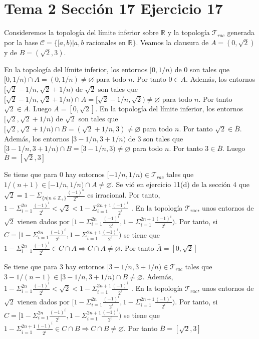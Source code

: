 \documentclass{article}
\begin{document}
\section{Tema 2 Sección 17 Ejercicio 17}
Consideremos la topología del límite inferior sobre $\mathbb{R}$ y la topología $\mathcal{T}_{rac}$ generada por la base $\mathcal{C}=\{[a,b)| a,b \text{ racionales en } \mathbb{R}\}$. Veamos la clausura de $A=(0,\sqrt{2})$ y de $B=(\sqrt{2},3)$. 

En la topología del límite inferior, los entornos $[0,1/n)$ de $0$ son tales que $[0,1/n)\cap A=(0,1/n)\neq \varnothing$ para todo $n$. Por tanto $0\in \overline{A}$. Además, los entornos $[\sqrt{2}-1/n,\sqrt{2}+1/n)$ de $\sqrt{2}$ son tales que $[\sqrt{2}-1/n,\sqrt{2}+1/n)\cap A=[\sqrt{2}-1/n,\sqrt{2})\neq \varnothing$ para todo $n$. Por tanto $\sqrt{2}\in \overline{A}$. Luego $\overline{A}= [0,\sqrt{2}]$. En la topología del límite inferior, los entornos $[\sqrt{2},\sqrt{2}+1/n)$ de $\sqrt{2}$ son tales que $[\sqrt{2},\sqrt{2}+1/n)\cap B=(\sqrt{2}+1/n,3)\neq \varnothing$ para todo $n$. Por tanto $\sqrt{2}\in \overline{B}$. Además, los entornos $[3-1/n,3+1/n)$ de $3$ son tales que $[3-1/n,3+1/n)\cap B=[3-1/n,3)\neq \varnothing$ para todo $n$. Por tanto $3\in \overline{B}$. Luego $\overline{B}= [\sqrt{2},3]$

Se tiene que para $0$ hay entornos $[-1/n,1/n)\in \mathcal{T}_{rac}$ tales que $1/(n+1)\in [-1/n,1/n)\cap A\neq \varnothing$.
Se vió en ejercicio 11(d) de la sección 4 que $\sqrt{2}=1-\Sigma_{\{n|n\in \mathbb{Z}_+\}}\frac{(-1)^n}{2^n}$ es irracional. Por tanto, $1-\Sigma_{i=1}^{2n}\frac{(-1)^{i}}{2^i}<\sqrt{2}<1-\Sigma_{i=1}^{2n+1}\frac{(-1)^{i}}{2^i}$ . En la topología $\mathcal{T}_{rac}$, unos entornos de $\sqrt{2}$ vienen dados por $[1-\Sigma_{i=1}^{2n}\frac{(-1)^{i}}{2^i},1-\Sigma_{i=1}^{2n+1}\frac{(-1)^{i}}{2^i})$. Por tanto, si $C=[1-\Sigma_{i=1}^{2n}\frac{(-1)^{i}}{2^i},1-\Sigma_{i=1}^{2n+1}\frac{(-1)^{i}}{2^i})$ se tiene que $1-\Sigma_{i=1}^{2n}\frac{(-1)^{i}}{2^i}\in C\cap A\Rightarrow C\cap A \neq \varnothing $. Por tanto $\overline{A}=[0,\sqrt{2}]$

Se tiene que para $3$ hay entornos $[3-1/n,3+1/n)\in \mathcal{T}_{rac}$ tales que $3-1/(n-1)\in [3-1/n,3+1/n)\cap B\neq \varnothing$. Además, $1-\Sigma_{i=1}^{2n}\frac{(-1)^{i}}{2^i}<\sqrt{2}<1-\Sigma_{i=1}^{2n+1}\frac{(-1)^{i}}{2^i}$ . En la topología $\mathcal{T}_{rac}$, unos entornos de $\sqrt{2}$ vienen dados por $[1-\Sigma_{i=1}^{2n}\frac{(-1)^{i}}{2^i},1-\Sigma_{i=1}^{2n+1}\frac{(-1)^{i}}{2^i})$. Por tanto, si $C=[1-\Sigma_{i=1}^{2n}\frac{(-1)^{i}}{2^i},1-\Sigma_{i=1}^{2n+1}\frac{(-1)^{i}}{2^i})$ se tiene que $1-\Sigma_{i=1}^{2n+1}\frac{(-1)^{i}}{2^i}\in C\cap B\Rightarrow C\cap B \neq \varnothing $. Por tanto $\overline{B}=[\sqrt{2},3]$
\end{document}
